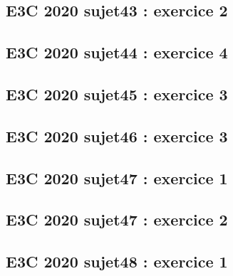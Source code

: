 \documentclass[lang=fr,edition=teacher,layout=sheet]{mxbook}
\begin{document}
\par\bigskip
{}\subsection*{E3C 2020 sujet43 : exercice 2}
\begingroup\endgroup
\par\bigskip
{}\subsection*{E3C 2020 sujet44 : exercice 4}
\begingroup\endgroup
\par\bigskip
{}\subsection*{E3C 2020 sujet45 : exercice 3}
\begingroup\endgroup
\par\bigskip
{}\subsection*{E3C 2020 sujet46 : exercice 3}
\begingroup\endgroup
\par\bigskip
{}\subsection*{E3C 2020 sujet47 : exercice 1}
\begingroup\endgroup
\par\bigskip
{}\subsection*{E3C 2020 sujet47 : exercice 2}
\begingroup\endgroup
\par\bigskip
{}\subsection*{E3C 2020 sujet48 : exercice 1}
\begingroup\endgroup
\par\bigskip
\end{document}
